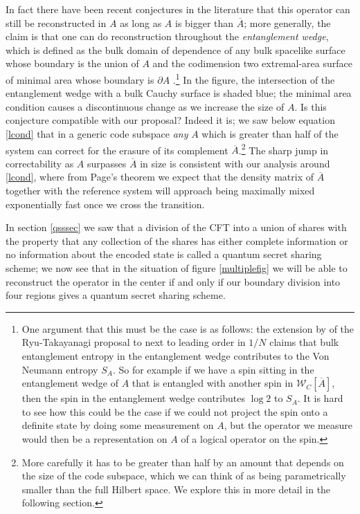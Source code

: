 \documentclass[11pt]{article}
\newcommand{\W}{\mathcal{W}}
\newcommand{\ol}{\overline}
\begin{document}
In fact there have been recent conjectures in the literature that this operator can still be reconstructed in $A$ as long as $A$ is bigger than $\ol{A}$; more generally, the claim is that one can do reconstruction throughout the \textit{entanglement wedge}, which is defined as the bulk domain of dependence of any bulk spacelike surface whose boundary is the union of $A$ and the codimension two extremal-area surface of minimal area whose boundary is $\partial A$ \cite{Czech:2012bh,Wall:2012uf,Headrick:2014cta,Jafferis:2014lza}.\footnote{One argument that this must be the case is as follows: the extension by \cite{Faulkner:2013ana} of the Ryu-Takayanagi proposal \cite{Ryu:2006bv} to next to leading order in $1/N$ claims that bulk entanglement entropy in the entanglement wedge contributes to the Von Neumann entropy $S_A$.  So for example if we have a spin sitting in the entanglement wedge of $A$ that is entangled with another spin in $\W_C[\ol{A}]$, then the spin in the entanglement wedge contributes $\log 2$ to $S_A$.  It is hard to see how this could be the case if we could not project the spin onto a definite state by doing some measurement on $A$, but the operator we measure would then be a representation on $A$ of a logical operator on the spin.}  In the figure, the intersection of the entanglement wedge with a bulk Cauchy surface is shaded blue; the minimal area condition causes a discontinuous change as we increase the size of $A$.  Is this conjecture compatible with our proposal?  Indeed it is; we saw below equation \eqref{lcond} that in a generic code subspace \textit{any} $A$ which is greater than half of the system can correct for the erasure of its complement $\ol{A}$.\footnote{More carefully it has to be greater than half by an amount that depends on the size of the code subspace, which we can think of as being parametrically smaller than the full Hilbert space.  We explore this in more detail in the following section.}  The sharp jump in correctability as $A$ surpasses $\ol{A}$ in size is consistent with our analysis around \eqref{lcond}, where from Page's theorem we expect that the density matrix of $\ol{A}$ together with the reference system will approach being maximally mixed exponentially fast once we cross the transition.


In section \ref{qsssec} we saw that a division of the CFT into a union of shares with the property that any collection of the shares has either complete information or no information about the encoded state is called a quantum secret sharing scheme; we now see that in the situation of figure \ref{multiplefig} we will be able to reconstruct the operator in the center if and only if our boundary division into four regions gives a quantum secret sharing scheme.  
\end{document}
